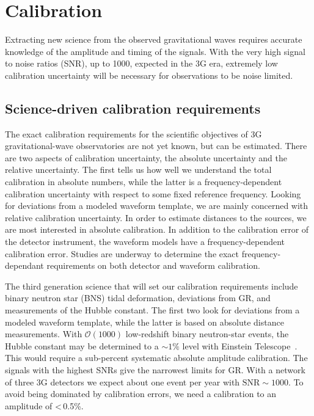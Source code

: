 \chapter{Calibration}
\label{sec:Calibration}
\vspace*{-2cm}

Extracting new science from the observed gravitational waves requires accurate knowledge of the amplitude and timing of the signals. With the very high signal to noise ratios (SNR), up to 1000, expected in the 3G era, extremely low calibration uncertainty will be necessary for observations to be noise limited.

\section{Science-driven calibration requirements}
The exact calibration requirements for the scientific objectives of 3G gravitational-wave observatories are not yet known, but can be estimated. There are two aspects of calibration uncertainty, the absolute uncertainty and the relative uncertainty. The first tells us how well we understand the total calibration in absolute numbers, while the latter is a frequency-dependent calibration uncertainty with respect to some fixed reference frequency. 
Looking for deviations from a modeled waveform template, we are mainly concerned with relative calibration uncertainty. In order to estimate distances to the sources, we are most interested in absolute calibration. In addition to the calibration error of the detector instrument, the waveform models have a frequency-dependent calibration error. Studies are underway to determine the exact frequency-dependant requirements on both detector and waveform calibration.

The third generation science that will set our calibration requirements include binary neutron star (BNS) tidal deformation, deviations from GR, and measurements of the Hubble constant. The first two look for deviations from a modeled waveform template, while the latter is based on absolute distance measurements. With $\mathcal{O}(1000)$ low-redshift binary neutron-star events, the Hubble constant may be determined to a ${\sim}1\%$ level with Einstein Telescope~\cite{Cai:2016sby}.
This would require a sub-percent systematic absolute amplitude calibration.
The signals with the highest SNRs give the narrowest limits for GR. With a network of three 3G detectors we expect about one event per year with $\text{SNR} \sim 1000$. To avoid being dominated by calibration errors, we need a calibration to an amplitude of <\,0.5\%.

